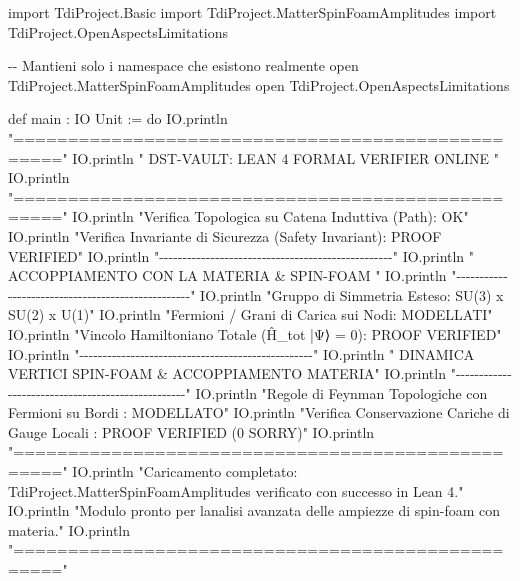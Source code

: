 \documentclass{article}
\newenvironment{Shaded}{%
  \begin{snugshade}%
}{%
  \end{snugshade}%
}%
\newenvironment{Highlighting}{%
}{%
}%
\newcommand{\NormalTok}[1]{#1}
\begin{document}
\begin{Shaded}
\begin{Highlighting}[]
\NormalTok{import TdiProject.Basic}
\NormalTok{import TdiProject.MatterSpinFoamAmplitudes}
\NormalTok{import TdiProject.OpenAspectsLimitations}

\NormalTok{{-}{-} Mantieni solo i namespace che esistono realmente}
\NormalTok{open TdiProject.MatterSpinFoamAmplitudes}
\NormalTok{open TdiProject.OpenAspectsLimitations}

\NormalTok{def main : IO Unit := do}
\NormalTok{  IO.println "=================================================="}
\NormalTok{  IO.println "   DST{-}VAULT: LEAN 4 FORMAL VERIFIER ONLINE       "}
\NormalTok{  IO.println "=================================================="}
\NormalTok{  IO.println "Verifica Topologica su Catena Induttiva (Path): OK"}
\NormalTok{  IO.println "Verifica Invariante di Sicurezza (Safety Invariant): PROOF VERIFIED"}
\NormalTok{  IO.println "{-}{-}{-}{-}{-}{-}{-}{-}{-}{-}{-}{-}{-}{-}{-}{-}{-}{-}{-}{-}{-}{-}{-}{-}{-}{-}{-}{-}{-}{-}{-}{-}{-}{-}{-}{-}{-}{-}{-}{-}{-}{-}{-}{-}{-}{-}{-}{-}{-}{-}"}
\NormalTok{  IO.println "   ACCOPPIAMENTO CON LA MATERIA \& SPIN{-}FOAM       "}
\NormalTok{  IO.println "{-}{-}{-}{-}{-}{-}{-}{-}{-}{-}{-}{-}{-}{-}{-}{-}{-}{-}{-}{-}{-}{-}{-}{-}{-}{-}{-}{-}{-}{-}{-}{-}{-}{-}{-}{-}{-}{-}{-}{-}{-}{-}{-}{-}{-}{-}{-}{-}{-}{-}"}
\NormalTok{  IO.println "Gruppo di Simmetria Esteso: SU(3) x SU(2) x U(1)"}
\NormalTok{  IO.println "Fermioni / Grani di Carica sui Nodi: MODELLATI"}
\NormalTok{  IO.println "Vincolo Hamiltoniano Totale (Ĥ\_tot |Ψ⟩ = 0): PROOF VERIFIED"}
\NormalTok{  IO.println "{-}{-}{-}{-}{-}{-}{-}{-}{-}{-}{-}{-}{-}{-}{-}{-}{-}{-}{-}{-}{-}{-}{-}{-}{-}{-}{-}{-}{-}{-}{-}{-}{-}{-}{-}{-}{-}{-}{-}{-}{-}{-}{-}{-}{-}{-}{-}{-}{-}{-}"}
\NormalTok{  IO.println "   DINAMICA VERTICI SPIN{-}FOAM \& ACCOPPIAMENTO MATERIA"}
\NormalTok{  IO.println "{-}{-}{-}{-}{-}{-}{-}{-}{-}{-}{-}{-}{-}{-}{-}{-}{-}{-}{-}{-}{-}{-}{-}{-}{-}{-}{-}{-}{-}{-}{-}{-}{-}{-}{-}{-}{-}{-}{-}{-}{-}{-}{-}{-}{-}{-}{-}{-}{-}{-}"}
\NormalTok{  IO.println "Regole di Feynman Topologiche con Fermioni su Bordi : MODELLATO"}
\NormalTok{  IO.println "Verifica Conservazione Cariche di Gauge Locali    : PROOF VERIFIED (0 SORRY)"}
\NormalTok{  IO.println "=================================================="}
\NormalTok{  IO.println "Caricamento completato: TdiProject.MatterSpinFoamAmplitudes verificato con successo in Lean 4."}
\NormalTok{  IO.println "Modulo pronto per l\textquotesingle{}analisi avanzata delle ampiezze di spin{-}foam con materia."}
\NormalTok{  IO.println "=================================================="}

\end{Highlighting}
\end{Shaded}
\end{document}
